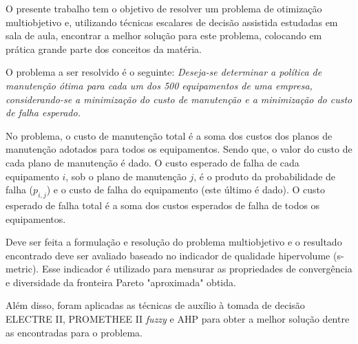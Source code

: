 O presente trabalho tem o objetivo de resolver um problema de otimização multiobjetivo e, utilizando técnicas escalares de decisão assistida estudadas em sala de aula, encontrar a melhor solução para este problema, colocando em prática grande parte dos conceitos da matéria.

O problema a ser resolvido é o seguinte: \emph{Deseja-se determinar a política de manutenção ótima para cada um dos 500 equipamentos de	uma empresa, considerando-se a minimização do custo de manutenção e a minimização do custo de falha esperado.}

No problema, o custo de manutenção total é a soma dos custos dos planos de manutenção adotados para todos os equipamentos. Sendo que, o valor do custo de cada plano de manutenção é dado. O custo esperado de falha de cada equipamento $i$, sob o plano de manutenção $j$, é o produto da probabilidade de falha ($p_{i,j}$) e o custo de falha do equipamento (este último é dado). O
custo esperado de falha total é a soma dos custos esperados de falha de todos os equipamentos.

Deve ser feita a formulação e resolução do problema multiobjetivo e o resultado encontrado deve ser avaliado baseado no indicador de qualidade hipervolume (s-metric). Esse indicador é utilizado para mensurar as propriedades de convergência e diversidade da fronteira Pareto "aproximada" obtida.

Além disso, foram aplicadas as técnicas de auxílio à tomada de decisão ELECTRE II, PROMETHEE II \emph{fuzzy} e AHP para obter a melhor solução dentre as encontradas para o problema.